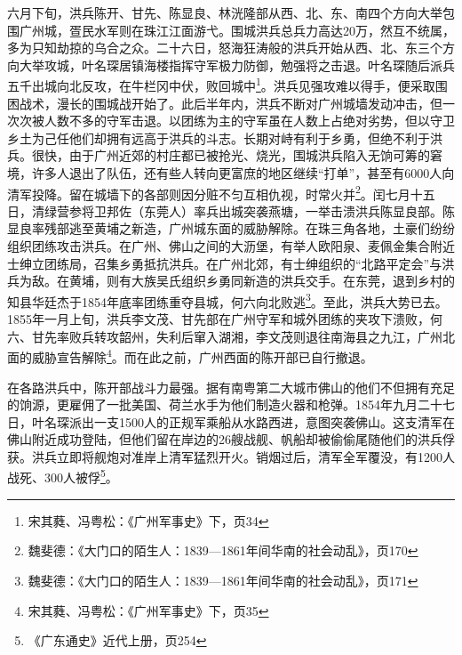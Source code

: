 六月下旬，洪兵陈开、甘先、陈显良、林洸隆部从西、北、东、南四个方向大举包围广州城，疍民水军则在珠江江面游弋。围城洪兵总兵力高达20万，然互不统属，多为只知劫掠的乌合之众。二十六日，怒海狂涛般的洪兵开始从西、北、东三个方向大举攻城，叶名琛居镇海楼指挥守军极力防御，勉强将之击退。叶名琛随后派兵五千出城向北反攻，在牛栏冈中伏，败回城中\footnote{宋其蕤、冯粤松：《广州军事史》下，页34}。洪兵见强攻难以得手，便采取围困战术，漫长的围城战开始了。此后半年内，洪兵不断对广州城墙发动冲击，但一次次被人数不多的守军击退。以团练为主的守军虽在人数上占绝对劣势，但以守卫乡土为己任他们却拥有远高于洪兵的斗志。长期对峙有利于乡勇，但绝不利于洪兵。很快，由于广州近郊的村庄都已被抢光、烧光，围城洪兵陷入无饷可筹的窘境，许多人退出了队伍，还有些人转向更富庶的地区继续“打单”，甚至有6000人向清军投降。留在城墙下的各部则因分赃不匀互相仇视，时常火并\footnote{魏斐德：《大门口的陌生人：1839—1861年间华南的社会动乱》，页170}。闰七月十五日，清绿营参将卫邦佐（东莞人）率兵出城突袭燕塘，一举击溃洪兵陈显良部。陈显良率残部逃至黄埔之新造，广州城东面的威胁解除。在珠三角各地，土豪们纷纷组织团练攻击洪兵。在广州、佛山之间的大沥堡，有举人欧阳泉、麦佩金集合附近士绅立团练局，召集乡勇抵抗洪兵。在广州北郊，有士绅组织的“北路平定会”与洪兵为敌。在黄埔，则有大族吴氏组织乡勇同新造的洪兵交手。在东莞，退到乡村的知县华廷杰于1854年底率团练重夺县城，何六向北败逃\footnote{魏斐德：《大门口的陌生人：1839—1861年间华南的社会动乱》，页171}。至此，洪兵大势已去。1855年一月上旬，洪兵李文茂、甘先部在广州守军和城外团练的夹攻下溃败，何六、甘先率败兵转攻韶州，失利后窜入湖湘，李文茂则退往南海县之九江，广州北面的威胁宣告解除\footnote{宋其蕤、冯粤松：《广州军事史》下，页35}。而在此之前，广州西面的陈开部已自行撤退。

在各路洪兵中，陈开部战斗力最强。据有南粤第二大城市佛山的他们不但拥有充足的饷源，更雇佣了一批美国、荷兰水手为他们制造火器和枪弹。1854年九月二十七日，叶名琛派出一支1500人的正规军乘船从水路西进，意图突袭佛山。这支清军在佛山附近成功登陆，但他们留在岸边的26艘战舰、帆船却被偷偷尾随他们的洪兵俘获。洪兵立即将舰炮对准岸上清军猛烈开火。销烟过后，清军全军覆没，有1200人战死、300人被俘\footnote{《广东通史》近代上册，页254}。

